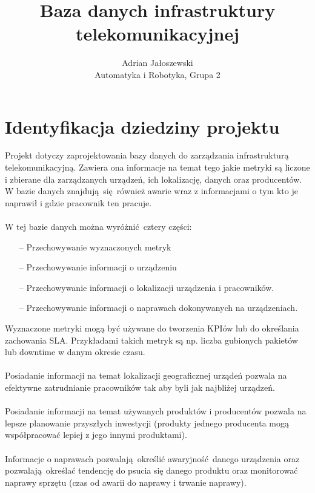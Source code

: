 \documentclass[a4paper, 12pt]{article}
\author{Adrian Jałoszewski\\ Automatyka i Robotyka, Grupa 2}
\title{Baza danych infrastruktury telekomunikacyjnej}
\date{}
\begin{document}
    \maketitle
    \section{Identyfikacja dziedziny projektu}
        Projekt dotyczy zaprojektowania bazy danych do zarządzania infrastrukturą
        telekomunikacyjną. Zawiera ona informacje na temat tego jakie metryki są 
        liczone i zbierane dla zarządzanych urządzeń, ich lokalizację, danych oraz 
        producentów. W bazie danych znajdują się również awarie wraz z informacjami
        o tym kto je naprawił i gdzie pracownik ten pracuje. 
        \\ \\
        W tej bazie danych można wyróżnić cztery części:
        \begin{itemize}
            \item[--] Przechowywanie wyznaczonych metryk
            \item[--] Przechowywanie informacji o urządzeniu
            \item[--] Przechowywanie informacji o lokalizacji urządzenia i
                pracowników.
            \item[--] Przechowywanie informacji o naprawach dokonywanych na
                urządzeniach.
        \end{itemize}
        Wyznaczone metryki mogą być używane do tworzenia KPIów lub do określania
        zachowania SLA. Przykładami takich metryk są np. liczba gubionych pakietów
        lub downtime w danym okresie czasu.
        \\ \\
        Posiadanie informacji na temat lokalizacji geograficznej urządeń pozwala
        na efektywne zatrudnianie pracowników tak aby byli jak najbliżej urządzeń.
        \\ \\
        Posiadanie informacji na temat używanych produktów i producentów pozwala
        na lepsze planowanie przyszłych inwestycji (produkty jednego producenta mogą 
        współpracować lepiej z jego innymi produktami).
        \\ \\
        Informacje o naprawach pozwalają określić awaryjność danego urządzenia oraz 
        pozwalają określać tendencję do psucia się danego produktu oraz monitorować
        naprawy sprzętu (czas od awarii do naprawy i trwanie naprawy).
\end{document}
